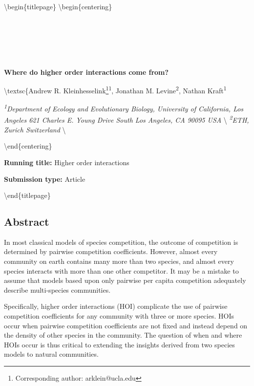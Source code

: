 \documentclass[12pt,]{article}
\title{}
\author{}
\date{}
\let\rmarkdownfootnote\footnote%
\def\footnote{\protect\rmarkdownfootnote}
\begin{document}
\renewcommand*{\thefootnote}{\fnsymbol{footnote}}

\textbackslash{}begin\{titlepage\} \textbackslash{}begin\{centering\}

\sloppy

~

~

~

\textbf{\large{Where do higher order interactions come from?}}

\textbackslash{}textsc\{\small{Andrew R. Kleinhesselink\footnote{Corresponding author: arklein@ucla.edu}\textsuperscript{1}, Jonathan M. Levine\textsuperscript{2}, Nathan Kraft\textsuperscript{1}}

\textit{\small{\textsuperscript{1}Department of Ecology and Evolutionary Biology, University of California, Los Angeles 621 Charles E. Young Drive South Los Angeles, CA 90095 USA}}
\textbackslash{}
\textit{\small{\textsuperscript{2}ETH, Zurich Switzerland}}
\textbackslash{}

\textbackslash{}end\{centering\}

\bigskip \textbf{Running title:} Higher order interactions

\smallskip \textbf{Submission type:} Article \vspace{3 cm}

\renewcommand*{\thefootnote}{\arabic{footnote}}

\setcounter{footnote}{0}

\textbackslash{}end\{titlepage\} \pagebreak{} \linenumbers

\subsection{Abstract}\label{abstract}

In most classical models of species competition, the outcome of
competition is determined by pairwise competition coefficients. However,
almost every community on earth contains many more than two species, and
almost every species interacts with more than one other competitor. It
may be a mistake to assume that models based upon only pairwise per
capita competition adequately describe multi-species communities.

Specifically, higher order interactions (HOI) complicate the use of
pairwise competition coefficients for any community with three or more
species. HOIs occur when pairwise competition coefficients are not fixed
and instead depend on the density of other species in the community. The
question of when and where HOIs occur is thus critical to extending the
insights derived from two species models to natural communities.
\end{document}
